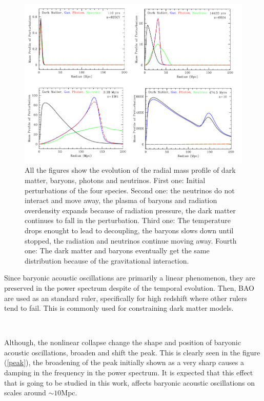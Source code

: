  
\begin{figure}[htbp]
       \centering
               \includegraphics[width=1.0\textwidth]{Images/chapter2/BAOS2.png}
       \caption{\small All the figures show the evolution of the radial mass profile of dark matter,  baryons, photons
       and neutrinos. First one: Initial perturbations of the four species. 
       Second one: the neutrinos do not interact and move away, 
       the plasma of baryons and radiation overdensity expands because of radiation pressure, the dark matter
       continues to fall in the perturbation. Third one: The temperature drops enought to lead to decoupling, 
      the baryons slows down until stopped, the radiation and neutrinos continue moving away. Fourth one:  
      The dark matter and baryons eventually get the same distribution because of the gravitational interaction.}
       \label{DBM}
 \end{figure}

Since baryonic acoustic oscillations are primarily a linear phenomenon, they are preserved in the power spectrum despite of 
the temporal evolution. Then,  BAO are used as an standard ruler, specifically for high redshift where other rulers tend to fail. 
This is commonly used for constraining dark matter models. 

\

Although, the nonlinear collapse change the shape and position of baryonic acoustic oscillations, broaden and shift the 
peak. This is clearly seen in the figure (\ref{peak}), the broadening of the peak initially shown as a very sharp causes 
a damping in the frequency in the power spectrum. It is expected that this effect that is going to be studied in this work, affects baryonic 
acoustic oscillations on scales around $\sim 10$Mpc.

